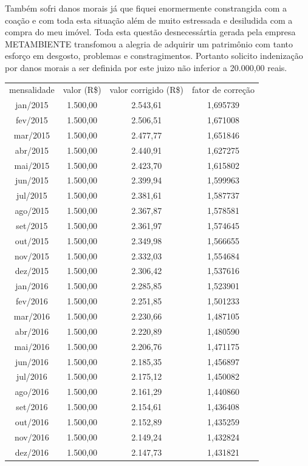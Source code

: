\documentclass[11pt]{letter}
\begin{document}
Também sofri danos morais já que fiquei enormermente constrangida com a coação e com toda esta situação além de muito estressada e desiludida com a compra do meu imóvel. Toda esta questão desnecessártia gerada pela empresa METAMBIENTE transfomou a alegria de adquirir um patrimônio com tanto esforço em desgosto, problemas e constragimentos. Portanto solicito indenização por danos morais a ser definida por este juizo não inferior a 20.000,00 reais. 

\begin{scriptsize}
\begin{center}
\begin{tabular}{ c c c c }
mensalidade & valor (R\$) & valor corrigido (R\$) & fator de correção \\ 
jan/2015 & 1.500,00 &  2.543,61 & 1,695739 \\  
fev/2015 & 1.500,00 &  2.506,51 & 1,671008 \\
mar/2015 & 1.500,00 &  2.477,77 & 1,651846 \\
abr/2015 & 1.500,00 &  2.440,91 & 1,627275 \\
mai/2015 & 1.500,00 &  2.423,70 & 1,615802 \\
jun/2015 & 1.500,00 &  2.399,94 & 1,599963 \\
jul/2015 & 1.500,00 &  2.381,61 & 1,587737 \\
ago/2015 & 1.500,00 &  2.367,87 & 1,578581 \\
set/2015 & 1.500,00 &  2.361,97 & 1,574645 \\
out/2015 & 1.500,00 &  2.349,98 & 1,566655 \\
nov/2015 & 1.500,00 &  2.332,03 & 1,554684 \\
dez/2015 & 1.500,00 &  2.306,42 & 1,537616 \\
jan/2016 & 1.500,00 &  2.285,85 & 1,523901 \\  
fev/2016 & 1.500,00 &  2.251,85 & 1,501233 \\
mar/2016 & 1.500,00 &  2.230,66 & 1,487105 \\
abr/2016 & 1.500,00 &  2.220,89 & 1,480590 \\
mai/2016 & 1.500,00 &  2.206,76 & 1,471175 \\
jun/2016 & 1.500,00 &  2.185,35 & 1,456897 \\
jul/2016 & 1.500,00 &  2.175,12 & 1,450082 \\
ago/2016 & 1.500,00 &  2.161,29 & 1,440860 \\
set/2016 & 1.500,00 &  2.154,61 & 1,436408 \\
out/2016 & 1.500,00 &  2.152,89 & 1,435259 \\
nov/2016 & 1.500,00 &  2.149,24 & 1,432824 \\
dez/2016 & 1.500,00 &  2.147,73 & 1,431821 \\


\end{tabular}
\end{center}
\end{scriptsize}
\end{document}
